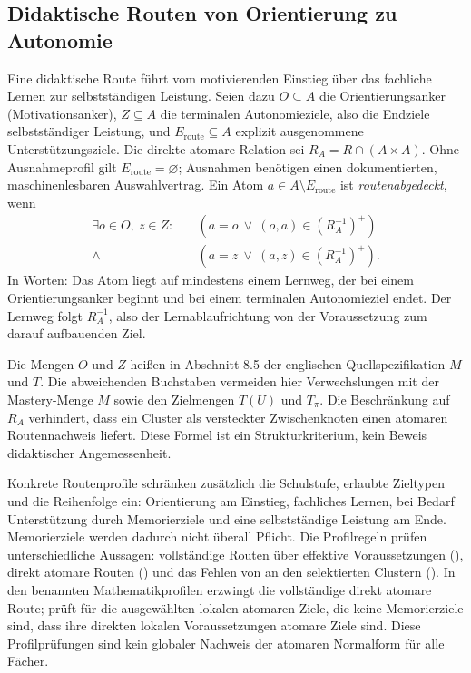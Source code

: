 \subsection{Didaktische Routen von Orientierung zu Autonomie}
\label{sec:routes}
Eine didaktische Route führt vom motivierenden Einstieg über das fachliche
Lernen zur selbstständigen Leistung. Seien dazu $O\subseteq A$ die
Orientierungsanker (Motivationsanker), $Z\subseteq A$ die terminalen
Autonomieziele, also die Endziele selbstständiger Leistung, und
$E_{\mathrm{route}}\subseteq A$ explizit ausgenommene Unterstützungsziele.
Die direkte atomare Relation sei
$R_A=R\cap(A\times A)$. Ohne Ausnahmeprofil gilt
$E_{\mathrm{route}}=\varnothing$; Ausnahmen benötigen einen dokumentierten,
maschinenlesbaren Auswahlvertrag. Ein Atom $a\in A\setminus E_{\mathrm{route}}$
ist \emph{routenabgedeckt}, wenn
\begin{equation}
 \begin{split}
 \exists o\in O,\ z\in Z:\quad
 &(a=o\ \lor\ (o,a)\in(R_A^{-1})^+)\\[-1mm]
 {}\land\;&(a=z\ \lor\ (a,z)\in(R_A^{-1})^+).
 \end{split}
\end{equation}
In Worten: Das Atom liegt auf mindestens einem Lernweg, der bei einem
Orientierungsanker beginnt und bei einem terminalen Autonomieziel endet.
Der Lernweg folgt $R_A^{-1}$, also der Lernablaufrichtung von der
Voraussetzung zum darauf aufbauenden Ziel.

Die Mengen $O$ und $Z$ heißen in Abschnitt 8.5 der englischen
Quellspezifikation $M$ und $T$. Die abweichenden Buchstaben vermeiden hier
Verwechslungen mit der Mastery-Menge $M$ sowie den Zielmengen $T(U)$ und
$T_\pi$.
Die Beschränkung auf $R_A$ verhindert, dass ein Cluster als versteckter
Zwischenknoten einen atomaren Routennachweis liefert. Diese Formel ist
ein Strukturkriterium, kein Beweis didaktischer Angemessenheit.

Konkrete Routenprofile schränken zusätzlich die Schulstufe, erlaubte
Zieltypen und die Reihenfolge ein: Orientierung am Einstieg,
fachliches Lernen, bei Bedarf Unterstützung durch Memorierziele und eine
selbstständige Leistung am Ende. Memorierziele werden dadurch nicht überall
Pflicht.
Die Profilregeln prüfen unterschiedliche Aussagen: vollständige Routen
über effektive Voraussetzungen (), direkt atomare Routen
() und das Fehlen von  an den selektierten
Clustern (). In den benannten Mathematikprofilen erzwingt
 die vollständige direkt atomare Route; 
prüft für die ausgewählten lokalen atomaren Ziele, die keine Memorierziele
sind, dass ihre direkten lokalen Voraussetzungen atomare Ziele sind. Diese
Profilprüfungen sind kein globaler Nachweis der atomaren Normalform für alle
Fächer.

